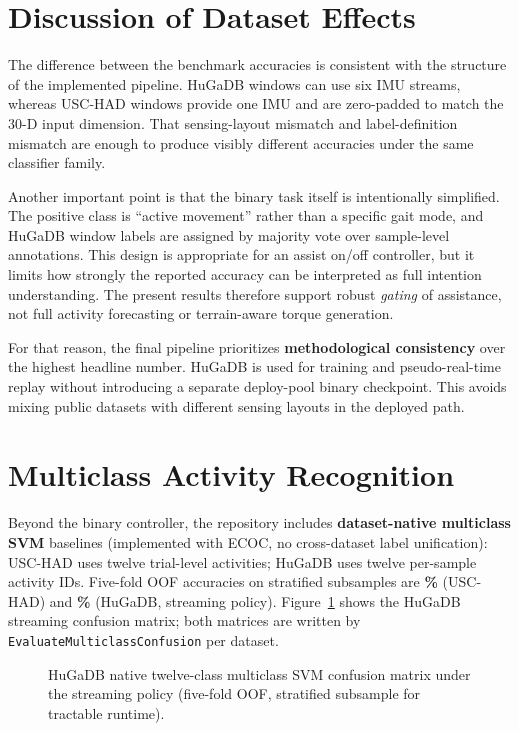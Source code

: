 \section{Discussion of Dataset Effects}
The difference between the benchmark accuracies is consistent with the structure of the implemented pipeline. HuGaDB windows can use six IMU streams, whereas USC-HAD windows provide one IMU and are zero-padded to match the 30-D input dimension. That sensing-layout mismatch and label-definition mismatch are enough to produce visibly different accuracies under the same classifier family.

Another important point is that the binary task itself is intentionally simplified. The positive class is ``active movement'' rather than a specific gait mode, and HuGaDB window labels are assigned by majority vote over sample-level annotations. This design is appropriate for an assist on/off controller, but it limits how strongly the reported accuracy can be interpreted as full intention understanding. The present results therefore support robust \emph{gating} of assistance, not full activity forecasting or terrain-aware torque generation.

For that reason, the final pipeline prioritizes \textbf{methodological consistency} over the highest headline number. HuGaDB is used for training and pseudo-real-time replay without introducing a separate deploy-pool binary checkpoint. This avoids mixing public datasets with different sensing layouts in the deployed path.

\section{Multiclass Activity Recognition}
Beyond the binary controller, the repository includes \textbf{dataset-native multiclass SVM} baselines (implemented with ECOC, no cross-dataset label unification): USC-HAD uses twelve trial-level activities; HuGaDB uses twelve per-sample activity IDs. Five-fold OOF accuracies on stratified subsamples are \textbf{\MulticlassOofAccUsc\%} (USC-HAD) and \textbf{\MulticlassOofAccHuGa\%} (HuGaDB, streaming policy). Figure~\ref{fig:cm_mc} shows the HuGaDB streaming confusion matrix; both matrices are written by \texttt{EvaluateMulticlassConfusion} per dataset.

\begin{figure}[htbp]
  \centering
  \caption{HuGaDB native twelve-class multiclass SVM confusion matrix under the streaming policy (five-fold OOF, stratified subsample for tractable runtime).}
  \label{fig:cm_mc}
\end{figure}

